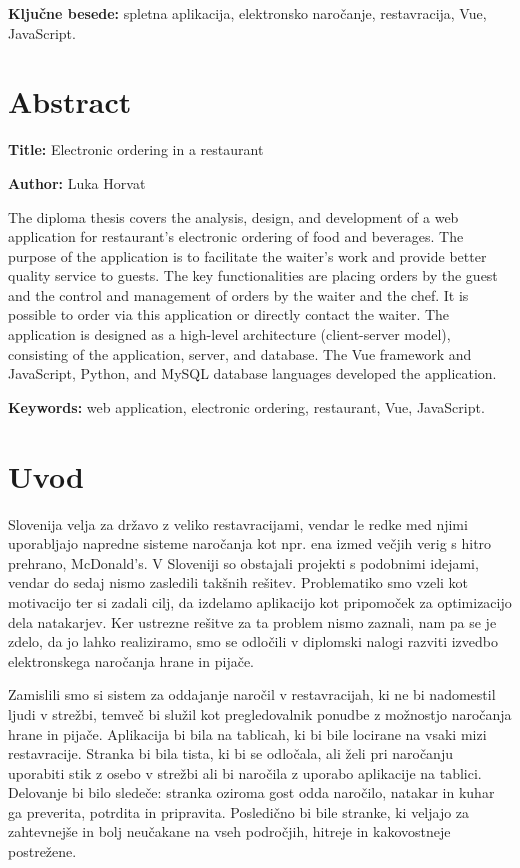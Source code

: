 \documentclass[a4paper, 12pt]{book}
\newcommand{\ttitleEn}{Electronic ordering in a restaurant}
\newcommand{\tauthor}{Luka Horvat}
\newcommand{\tkeywords}{spletna aplikacija, elektronsko naročanje, restavracija, Vue, JavaScript}
\newcommand{\tkeywordsEn}{web application, electronic ordering, restaurant, Vue, JavaScript}
\newcommand{\clearemptydoublepage}{\newpage{\pagestyle{empty}\cleardoublepage}}
\begin{document}
\noindent\textbf{Ključne besede:} \tkeywords.
\clearemptydoublepage

\chapter*{Abstract}

\noindent\textbf{Title:} \ttitleEn
\bigskip

\noindent\textbf{Author:} \tauthor
\bigskip

\noindent The diploma thesis covers the analysis, design, and development of a web application for restaurant's electronic ordering of food and beverages. The purpose of the application is to facilitate the waiter's work and provide better quality service to guests. The key functionalities are placing orders by the guest and the control and management of orders by the waiter and the chef. It is possible to order via this application or directly contact the waiter. The application is designed as a high-level architecture (client-server model), consisting of the application, server, and database. The Vue framework and JavaScript, Python, and MySQL database languages developed the application.
\bigskip

\noindent\textbf{Keywords:} \tkeywordsEn.
\clearemptydoublepage

\mainmatter
\setcounter{page}{1}
\pagestyle{fancy}
 
\chapter{Uvod}
Slovenija velja za državo z veliko restavracijami, vendar le redke med njimi uporabljajo napredne sisteme naročanja kot npr. ena izmed večjih verig s hitro prehrano, McDonald's. V Sloveniji so obstajali projekti s podobnimi idejami, vendar do sedaj nismo zasledili takšnih rešitev. Problematiko smo vzeli kot motivacijo ter si zadali cilj, da izdelamo aplikacijo kot pripomoček za optimizacijo dela natakarjev. Ker ustrezne rešitve za ta problem nismo zaznali, nam pa se je zdelo, da jo lahko realiziramo, smo se odločili v diplomski nalogi razviti izvedbo elektronskega naročanja hrane in pijače.

Zamislili smo si sistem za oddajanje naročil v restavracijah, ki ne bi nadomestil ljudi v strežbi, temveč bi služil kot pregledovalnik ponudbe z možnostjo naročanja hrane in pijače. Aplikacija bi bila na tablicah, ki bi bile locirane na vsaki mizi restavracije. Stranka bi bila tista, ki bi se odločala, ali želi pri naročanju uporabiti stik z osebo v strežbi ali bi naročila z uporabo aplikacije na tablici. Delovanje bi bilo sledeče: stranka oziroma gost odda naročilo, natakar in kuhar ga preverita, potrdita in pripravita. Posledično bi bile stranke, ki veljajo za zahtevnejše in bolj neučakane na vseh področjih, hitreje in kakovostneje postrežene. 
\end{document}
